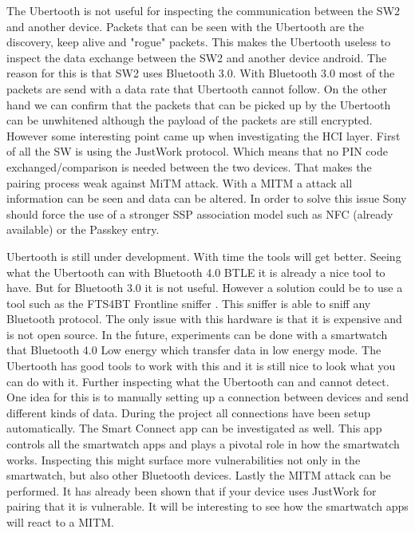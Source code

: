 The Ubertooth is not useful for inspecting the communication between the SW2 and another device. Packets that can be seen with the Ubertooth are the discovery, keep alive and  "rogue" packets. This makes the Ubertooth useless to inspect the data exchange between the SW2 and another device android. The reason for this is that SW2 uses Bluetooth 3.0. With Bluetooth 3.0 most of the packets are send with a data rate that Ubertooth cannot follow. On the other hand we can confirm that the packets that can be picked up by the Ubertooth can be unwhitened although the payload of the packets are still encrypted. \pend 
However some interesting point came up when investigating the HCI layer. First of all the SW is using the JustWork protocol. Which means that no PIN code exchanged/comparison is needed between the two devices. That makes the pairing process weak against MiTM attack. With a MITM a attack all information can be seen and data can be altered. In order to solve this issue Sony should force the use of a stronger SSP association model such as NFC (already available) or the Passkey entry.   

Ubertooth is still under development. With time the tools will get better. Seeing what the Ubertooth can with Bluetooth 4.0 BTLE it is already a nice tool to have. But for Bluetooth 3.0 it is not useful. However a solution could be to use a tool such as the FTS4BT Frontline sniffer \cite{FTS4BT}. This sniffer is able to sniff any Bluetooth protocol. The only issue with this hardware is that it is expensive and is not open source.
\pend
In the future, experiments can be done with a smartwatch that Bluetooth 4.0 Low energy which transfer data in low energy mode. The Ubertooth has good tools to work with this and it is still nice to look what you can do with it.\pend
Further inspecting what the Ubertooth can and cannot detect. One idea for this is to manually setting up a connection between devices and send different kinds of data. During the project all connections have been setup automatically. \pend
The Smart Connect app can be investigated as well. This app controls all the smartwatch apps and plays a pivotal role in how the smartwatch works. Inspecting this might surface more vulnerabilities not only in the smartwatch, but also other Bluetooth devices. \pend
Lastly the MITM attack can be performed. It has already been shown that if your device uses JustWork for pairing that it is vulnerable. It will be interesting to see how the smartwatch apps will react to a MITM. 